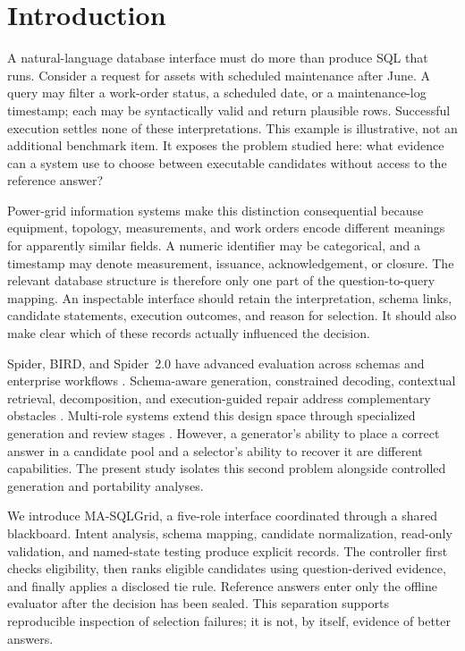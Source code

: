 \documentclass[information,article,submit,moreauthors]{Definitions/mdpi}
\newcommand{\masql}{MA-SQLGrid}
\begin{document}
\section{Introduction}

A natural-language database interface must do more than produce SQL that runs. Consider a request for assets with scheduled maintenance after June. A query may filter a work-order status, a scheduled date, or a maintenance-log timestamp; each may be syntactically valid and return plausible rows. Successful execution settles none of these interpretations. This example is illustrative, not an additional benchmark item. It exposes the problem studied here: what evidence can a system use to choose between executable candidates without access to the reference answer?

Power-grid information systems make this distinction consequential because equipment, topology, measurements, and work orders encode different meanings for apparently similar fields. A numeric identifier may be categorical, and a timestamp may denote measurement, issuance, acknowledgement, or closure. The relevant database structure is therefore only one part of the question-to-query mapping. An inspectable interface should retain the interpretation, schema links, candidate statements, execution outcomes, and reason for selection. It should also make clear which of these records actually influenced the decision.

Spider, BIRD, and Spider~2.0 have advanced evaluation across schemas and enterprise workflows \cite{yu2018spider,li2023bird,lei2025spider2}. Schema-aware generation, constrained decoding, contextual retrieval, decomposition, and execution-guided repair address complementary obstacles \cite{wang2020ratsql,scholak2021picard,nan2023enhancing,pourreza2023dinsql,talaei2024chess}. Multi-role systems extend this design space through specialized generation and review stages \cite{lee2025team,wang2025macsql,shao2025qcmasql,xia2025r3}. However, a generator's ability to place a correct answer in a candidate pool and a selector's ability to recover it are different capabilities. The present study isolates this second problem alongside controlled generation and portability analyses.

We introduce \masql{}, a five-role interface coordinated through a shared blackboard. Intent analysis, schema mapping, candidate normalization, read-only validation, and named-state testing produce explicit records. The controller first checks eligibility, then ranks eligible candidates using question-derived evidence, and finally applies a disclosed tie rule. Reference answers enter only the offline evaluator after the decision has been sealed. This separation supports reproducible inspection of selection failures; it is not, by itself, evidence of better answers.
\end{document}
